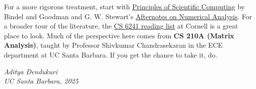 \documentclass[../main.tex]{subfiles}
\begin{document}
\medskip

For a more rigorous treatment, start with \href{https://math.nyu.edu/~shelley/Classes/SciComp/BindelGoodman.pdf}{Principles of Scientific Computing} by Bindel and Goodman and G. W. Stewart's \href{https://epubs.siam.org/doi/book/10.1137/1.9781611971491}{Afternotes on Numerical Analysis}. For a broader tour of the literature, the \href{https://www.cs.cornell.edu/courses/cs6241/2025sp/reading.html}{CS 6241 reading list} at Cornell is a great place to look. Much of the perspective here comes from \textbf{CS 210A (Matrix Analysis)}, taught by Professor Shivkumar Chandrasekaran in the ECE department at UC Santa Barbara. If you get the chance to take it, do.

\vspace{1em}
\begin{flushright}
\textit{Aditya Dendukuri} \\
\textit{UC Santa Barbara, 2025}
\end{flushright}

\newpage
\end{document}
